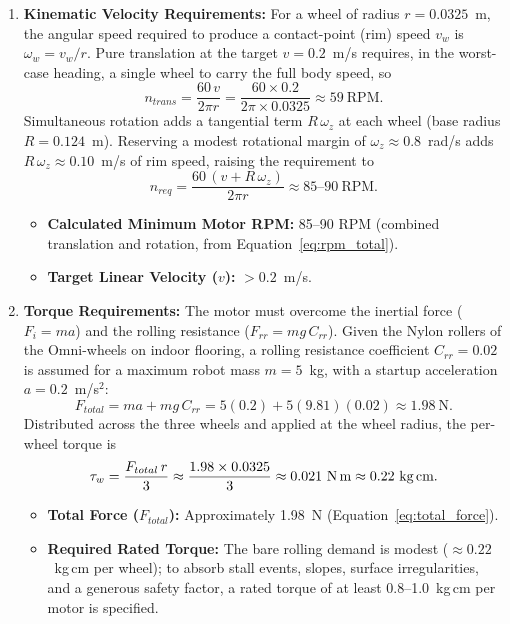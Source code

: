 \begin{enumerate}
    \item \textbf{Kinematic Velocity Requirements:} For a wheel of radius $r = 0.0325$~m, the angular speed required to produce a contact-point (rim) speed $v_w$ is $\omega_w = v_w / r$. Pure translation at the target $v = 0.2$~m/s requires, in the worst-case heading, a single wheel to carry the full body speed, so
    \begin{equation}
        n_{trans} = \frac{60\,v}{2\pi r} = \frac{60 \times 0.2}{2\pi \times 0.0325} \approx 59~\text{RPM}.
        \label{eq:rpm_translation}
    \end{equation}
    Simultaneous rotation adds a tangential term $R\,\omega_z$ at each wheel (base radius $R = 0.124$~m). Reserving a modest rotational margin of $\omega_z \approx 0.8$~rad/s adds $R\,\omega_z \approx 0.10$~m/s of rim speed, raising the requirement to
    \begin{equation}
        n_{req} = \frac{60\,(v + R\,\omega_z)}{2\pi r} \approx 85\text{--}90~\text{RPM}.
        \label{eq:rpm_total}
    \end{equation}
    \begin{itemize}
        \item \textbf{Calculated Minimum Motor RPM:} 85--90 RPM (combined translation and rotation, from Equation~\ref{eq:rpm_total}).
        \item \textbf{Target Linear Velocity ($v$):} $> 0.2$~m/s.
    \end{itemize}
    \item \textbf{Torque Requirements:} The motor must overcome the inertial force ($F_i = m a$) and the rolling resistance ($F_{rr} = m g\,C_{rr}$). Given the Nylon rollers of the Omni-wheels on indoor flooring, a rolling resistance coefficient $C_{rr} = 0.02$ is assumed for a maximum robot mass $m = 5$~kg, with a startup acceleration $a = 0.2$~m/s$^2$:
    \begin{equation}
        F_{total} = m a + m g\,C_{rr} = 5(0.2) + 5(9.81)(0.02) \approx 1.98~\text{N}.
        \label{eq:total_force}
    \end{equation}
    Distributed across the three wheels and applied at the wheel radius, the per-wheel torque is
    \begin{equation}
        \tau_w = \frac{F_{total}\,r}{3} \approx \frac{1.98 \times 0.0325}{3} \approx 0.021~\text{N\,m} \approx 0.22~\text{kg\,cm}.
        \label{eq:wheel_torque}
    \end{equation}
    \begin{itemize}
        \item \textbf{Total Force ($F_{total}$):} Approximately 1.98~N (Equation~\ref{eq:total_force}).
        \item \textbf{Required Rated Torque:} The bare rolling demand is modest ($\approx 0.22$~kg\,cm per wheel); to absorb stall events, slopes, surface irregularities, and a generous safety factor, a rated torque of at least 0.8--1.0~kg\,cm per motor is specified.
    \end{itemize}
\end{enumerate}

